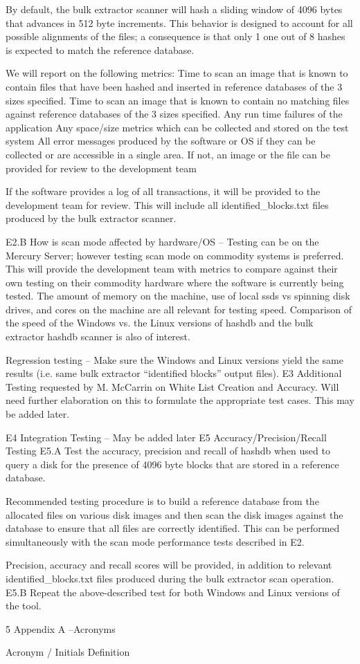 \documentclass[12pt,twoside]{article}
\begin{document}
By default, the bulk extractor scanner will hash a sliding window of 4096 bytes that advances in 512 byte increments. This behavior is designed to account for all possible alignments of the files; a consequence is that only 1 one out of 8 hashes is expected to match the reference database.

We will report on the following metrics:
Time to scan an image that is known to contain files that have been hashed and inserted in reference databases of the 3 sizes specified.
Time to scan an image that is known to contain no matching files against reference databases of the 3 sizes specified.
Any run time failures of the application
Any space/size metrics which can be collected and stored on the test system
All error messages produced by the software or OS if they can be collected or are accessible in a single area.  If not, an image or the file can be provided for review to the development team

If the software provides a log of all transactions, it will be provided to the development team for review. This will include all identified_blocks.txt files produced by the bulk extractor scanner.

E2.B
How is scan mode affected by hardware/OS – 
Testing can be on the Mercury Server; however testing scan mode on commodity systems is preferred.
This will provide the development team with metrics to compare against their own testing on their commodity hardware where the software is currently being tested.
The amount of memory on the machine, use of local ssds vs spinning disk drives, and cores on the machine are all relevant for testing speed.
Comparison of the speed of the Windows vs. the Linux versions of hashdb and the bulk extractor hashdb scanner is also of interest.

Regression testing – Make sure the Windows and Linux versions yield the same results (i.e. same bulk extractor “identified blocks” output files). 
E3
Additional Testing requested by M. McCarrin on White List Creation and Accuracy.  Will need further elaboration on this to formulate the appropriate test cases. This may be added later.




E4
Integration Testing – May be added later
E5
Accuracy/Precision/Recall Testing
E5.A
Test the accuracy, precision and recall of hashdb when used to query a disk for the presence of 4096 byte blocks that are stored in a reference database.

Recommended testing procedure is to build a reference database from the allocated files on various disk images and then scan the disk images against the database to ensure that all files are correctly identified. This can be performed simultaneously with the scan mode performance tests described in E2.

Precision, accuracy and recall scores will be provided, in addition to relevant identified_blocks.txt files produced during the bulk extractor scan operation.
E5.B
Repeat the above-described test for both Windows and Linux versions of the tool.

5 Appendix A –Acronyms

Acronym / Initials
Definition
\end{document}
